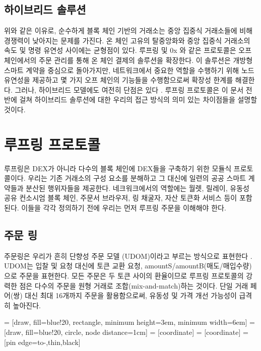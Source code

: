 \documentclass{article}
\makeatletter
\newenvironment{figurehere}
{\def\@captype{figure}}
{}
\makeatother
\begin{document}
\begin{multicols}{2}
\subsection{하이브리드 솔루션} 
위와 같은 이유로, 순수하게 블록 체인 기반의 거래소는 중앙 집중식 거래소들에 비해 경쟁력이 낮아지는 문제를 가진다. 온 체인 고유의 탈중앙화와 중앙 집중식 거래소의 속도 및 명령 유연성 사이에는 균형점이 있다. 루프링 및 0x \cite{warren20170x}와 같은 프로토콜은 오프 체인에서의 주문 관리를 통해 온 체인 결제의 솔루션을 확장한다. 이 솔루션은 개방형 스마트 계약을 중심으로 돌아가지만, 네트워크에서 중요한 역할을 수행하기 위해 노드 유연성을 제공하고 몇 가지 오프 체인의 기능들을 수행함으로써 확장성 한계를 해결한다. 그러나, 하이브리드 모델에도 여전히 단점은 있다 \cite{costofdecent}. 루프링 프로토콜은 이 문서 전반에 걸쳐 하이브리드 솔루션에 대한 우리의 접근 방식의 의미 있는 차이점들을 설명할 것이다.



\section{루프링 프로토콜\label{sec:loopring_protocol}}
루프링은 DEX가 아니라 다수의 블록 체인에 DEX들을 구축하기 위한 모듈식 프로토콜이다. 우리는 기존 거래소의 구성 요소를 분해하고 그 대신에 일련의 공공 스마트 계약들과 분산된 행위자들을 제공한다. 
네크워크에서의 역할에는 월렛, 릴레이, 유동성 공유 컨소시엄 블록 체인, 주문서 브라우저, 링 채굴자, 자산 토큰화 서비스 등이 포함된다. 이들을 각각 정의하기 전에 우리는 먼저 루프링 주문을 이해해야 한다.

\subsection{주문 링\label{sec:order_ring}}
주문링은 우리가 흔히 단향성 주문 모델 (UDOM)이라고 부르는 방식으로 표현한다 \cite{coinport2014udom}. UDOM는 입찰 및 요청 대신에 토큰 교환 요청, amountS/amountB(매도/매입수량)으로 주문을 표현한다. 모든 주문은 두 토큰 사이의 환율이므로 루프링 프로토콜의 강력한 점은 다수의 주문을 원형 거래로 조합(mix-and-match)하는 것이다. 단일 거래 페어(쌍) 대신 최대 16개까지 주문을 활용함으로써, 유동성 및 가격 개선 가능성이 급격히 높아진다. 

\begin{center}
	\begin{figurehere}
		\centering
		 = [draw, fill=blue!20, rectangle, 
		minimum height=3em, minimum width=6em]
		 = [draw, fill=blue!20, circle, node distance=1cm]
		 = [coordinate]
		 = [coordinate]
		 = [pin edge={to-,thin,black}]
		

\end{figurehere}
\end{center}
\end{multicols}
\end{document}
